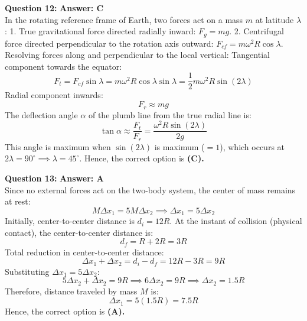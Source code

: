 \documentclass[11pt,a4paper]{article}
\begin{document}
\begin{tcolorbox}[solbox]
  \textbf{\textcolor{primaryDark}{Question 12:}} \hfill \textbf{\textcolor{l3Crimson}{Answer: C}}\\
  \vspace{3pt}
  In the rotating reference frame of Earth, two forces act on a mass $m$ at latitude $\lambda$:
1. True gravitational force directed radially inward: $F_g = mg$.
2. Centrifugal force directed perpendicular to the rotation axis outward: $F_{cf} = m\omega^2 R\cos\lambda$.
\vspace{3pt}
Resolving forces along and perpendicular to the local vertical:
Tangential component towards the equator:
$$F_t = F_{cf}\sin\lambda = m\omega^2 R\cos\lambda\sin\lambda = \frac{1}{2}m\omega^2 R\sin(2\lambda)$$
Radial component inwards:
$$F_r \approx mg$$
\vspace{3pt}
The deflection angle $\alpha$ of the plumb line from the true radial line is:
$$\tan\alpha \approx \frac{F_t}{F_r} = \frac{\omega^2 R\sin(2\lambda)}{2g}$$
This angle is maximum when $\sin(2\lambda)$ is maximum ($= 1$), which occurs at $2\lambda = 90^\circ \implies \lambda = 45^\circ$.
\vspace{3pt}
Hence, the correct option is \textbf{(C)}\textbf{.}
\end{tcolorbox}
\vspace{3pt}

\begin{tcolorbox}[solbox]
  \textbf{\textcolor{primaryDark}{Question 13:}} \hfill \textbf{\textcolor{l3Crimson}{Answer: A}}\\
  \vspace{3pt}
  Since no external forces act on the two-body system, the center of mass remains at rest:
$$M \Delta x_1 = 5M \Delta x_2 \implies \Delta x_1 = 5 \Delta x_2$$
\vspace{3pt}
Initially, center-to-center distance is $d_i = 12R$.
At the instant of collision (physical contact), the center-to-center distance is:
$$d_f = R + 2R = 3R$$
Total reduction in center-to-center distance:
$$\Delta x_1 + \Delta x_2 = d_i - d_f = 12R - 3R = 9R$$
\vspace{3pt}
Substituting $\Delta x_1 = 5\Delta x_2$:
$$5\Delta x_2 + \Delta x_2 = 9R \implies 6\Delta x_2 = 9R \implies \Delta x_2 = 1.5R$$
Therefore, distance traveled by mass $M$ is:
$$\Delta x_1 = 5(1.5R) = 7.5R$$
\vspace{3pt}
Hence, the correct option is \textbf{(A)}\textbf{.}
\end{tcolorbox}
\vspace{3pt}
\end{document}
